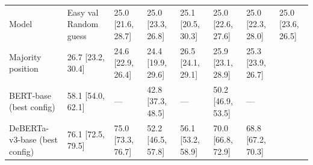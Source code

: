 \begin{tabular}{lllllll}
\toprule
Model & Easy val %
\midrule
Random guess & 25.0 [21.6, 28.7] & 25.0 [23.3, 26.8] & 25.1 [20.5, 30.3] & 25.0 [22.6, 27.6] & 25.0 [22.3, 28.0] & 25.0 [23.6, 26.5] \\
Majority position & 26.7 [23.2, 30.4] & 24.6 [22.9, 26.4] & 24.4 [19.9, 29.6] & 26.5 [24.1, 29.1] & 25.9 [23.1, 28.9] & 25.3 [23.9, 26.7] \\
BERT-base (best config) & 58.1 [54.0, 62.1] & — & 42.8 [37.3, 48.5] & — & 50.2 [46.9, 53.5] & — \\
DeBERTa-v3-base (best config) & 76.1 [72.5, 79.5] & 75.0 [73.3, 76.7] & 52.2 [46.5, 57.8] & 56.1 [53.2, 58.9] & 70.0 [66.8, 72.9] & 68.8 [67.2, 70.3] \\
\bottomrule
\end{tabular}

